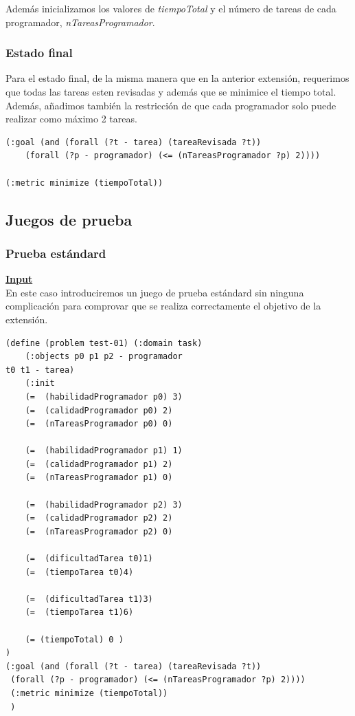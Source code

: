 \documentclass[11pt]{article}
\begin{document}
\noindent Además inicializamos los valores de \textit{tiempoTotal} y el número de tareas de cada programador, \textit{nTareasProgramador}. 

\subsubsection{Estado final}
Para el estado final, de la misma manera que en la anterior extensión, requerimos que todas las tareas esten revisadas y además que se minimice el tiempo total. Además, añadimos también la restricción de que cada programador solo puede realizar como máximo 2 tareas. 

\begin{verbatim}
(:goal (and (forall (?t - tarea) (tareaRevisada ?t))
	(forall (?p - programador) (<= (nTareasProgramador ?p) 2))))

(:metric minimize (tiempoTotal))
\end{verbatim}
\subsection{Juegos de prueba}
\subsubsection{Prueba estándard}
\underline{\textbf{Input}}\\

En este caso introduciremos un juego de prueba estándard sin ninguna complicación para comprovar que se realiza correctamente el objetivo de la extensión. 
\begin{verbatim}
(define (problem test-01) (:domain task) 
	(:objects p0 p1 p2 - programador
t0 t1 - tarea)
	(:init
	(=  (habilidadProgramador p0) 3)
	(=  (calidadProgramador p0) 2)
	(=  (nTareasProgramador p0) 0)

	(=  (habilidadProgramador p1) 1)
	(=  (calidadProgramador p1) 2)
	(=  (nTareasProgramador p1) 0)

	(=  (habilidadProgramador p2) 3)
	(=  (calidadProgramador p2) 2)
	(=  (nTareasProgramador p2) 0)

	(=  (dificultadTarea t0)1)
	(=  (tiempoTarea t0)4)

	(=  (dificultadTarea t1)3)
	(=  (tiempoTarea t1)6)

	(= (tiempoTotal) 0 )
)
(:goal (and (forall (?t - tarea) (tareaRevisada ?t))
 (forall (?p - programador) (<= (nTareasProgramador ?p) 2))))
 (:metric minimize (tiempoTotal))
 )
 \end{verbatim}
 \medskip
\end{document}

